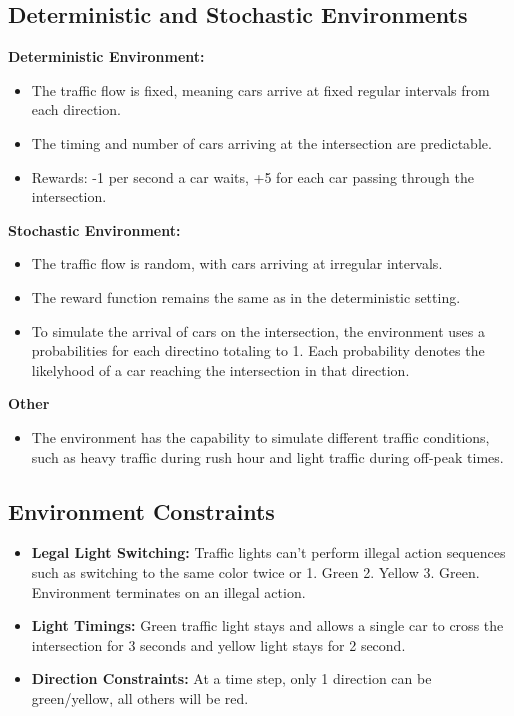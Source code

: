 \documentclass{article}
\begin{document}
\subsection{Deterministic and Stochastic Environments}
\textbf{Deterministic Environment:}
\begin{itemize}
    \item The traffic flow is fixed, meaning cars arrive at fixed regular intervals from each direction.
    \item The timing and number of cars arriving at the intersection are predictable.
    \item Rewards: -1 per second a car waits, +5 for each car passing through the intersection.
\end{itemize}

\textbf{Stochastic Environment:}
\begin{itemize}
    \item The traffic flow is random, with cars arriving at irregular intervals.
    \item The reward function remains the same as in the deterministic setting.
    \item To simulate the arrival of cars on the intersection, the environment uses a probabilities for each directino totaling to 1. Each probability denotes the likelyhood of a car reaching the intersection in that direction.
\end{itemize}

\textbf{Other}
\begin{itemize}
    \item The environment has the capability to simulate different traffic conditions, such as heavy traffic during rush hour and light traffic during off-peak times.
\end{itemize}

\subsection{Environment Constraints}
\begin{itemize}
    \item \textbf{Legal Light Switching:} Traffic lights can't perform illegal action sequences such as switching to the same color twice or 1. Green 2. Yellow 3. Green. Environment terminates on an illegal action.
    \item \textbf{Light Timings:} Green traffic light stays and allows a single car to cross the intersection for 3 seconds and yellow light stays for 2 second.
    \item \textbf{Direction Constraints:} At a time step, only 1 direction can be green/yellow, all others will be red.
\end{itemize}
\end{document}
